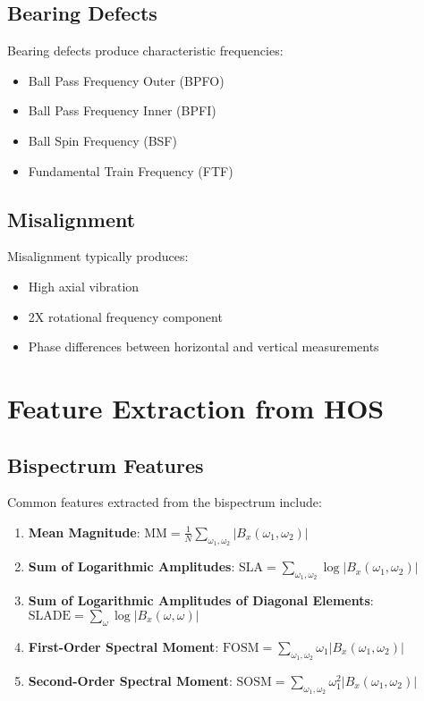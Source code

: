 \subsection{Bearing Defects}

Bearing defects produce characteristic frequencies:

\begin{itemize}
    \item Ball Pass Frequency Outer (BPFO)
    \item Ball Pass Frequency Inner (BPFI)
    \item Ball Spin Frequency (BSF)
    \item Fundamental Train Frequency (FTF)
\end{itemize}

\subsection{Misalignment}

Misalignment typically produces:

\begin{itemize}
    \item High axial vibration
    \item 2X rotational frequency component
    \item Phase differences between horizontal and vertical measurements
\end{itemize}

\section{Feature Extraction from HOS}

\subsection{Bispectrum Features}

Common features extracted from the bispectrum include:

\begin{enumerate}
    \item \textbf{Mean Magnitude}: $\text{MM} = \frac{1}{N} \sum_{\omega_1, \omega_2} |B_x(\omega_1, \omega_2)|$
    \item \textbf{Sum of Logarithmic Amplitudes}: $\text{SLA} = \sum_{\omega_1, \omega_2} \log|B_x(\omega_1, \omega_2)|$
    \item \textbf{Sum of Logarithmic Amplitudes of Diagonal Elements}: $\text{SLADE} = \sum_{\omega} \log|B_x(\omega, \omega)|$
    \item \textbf{First-Order Spectral Moment}: $\text{FOSM} = \sum_{\omega_1, \omega_2} \omega_1 |B_x(\omega_1, \omega_2)|$
    \item \textbf{Second-Order Spectral Moment}: $\text{SOSM} = \sum_{\omega_1, \omega_2} \omega_1^2 |B_x(\omega_1, \omega_2)|$
\end{enumerate}


